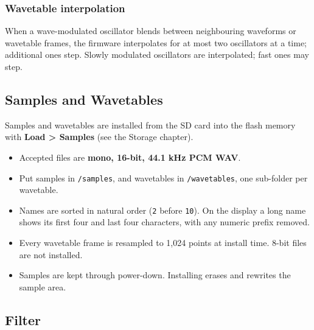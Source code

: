 \subsubsection{Wavetable interpolation}\label{wavetable-interpolation}

When a wave-modulated oscillator blends between neighbouring waveforms
or wavetable frames, the firmware interpolates for at most two
oscillators at a time; additional ones step. Slowly modulated
oscillators are interpolated; fast ones may step.

\subsection{Samples and Wavetables}\label{samples-and-wavetables}

Samples and wavetables are installed from the SD card into the flash
memory with \textbf{Load \textgreater{} Samples} (see the Storage
chapter).

\begin{itemize}
\tightlist
\item
  Accepted files are \textbf{mono, 16-bit, 44.1 kHz PCM WAV}.
\item
  Put samples in \texttt{/samples}, and wavetables in
  \texttt{/wavetables}, one sub-folder per wavetable.
\item
  Names are sorted in natural order (\texttt{2} before \texttt{10}). On
  the display a long name shows its first four and last four characters,
  with any numeric prefix removed.
\item
  Every wavetable frame is resampled to 1,024 points at install time.
  8-bit files are not installed.
\item
  Samples are kept through power-down. Installing erases and rewrites
  the sample area.
\end{itemize}



\subsection{Filter}\label{filter}

